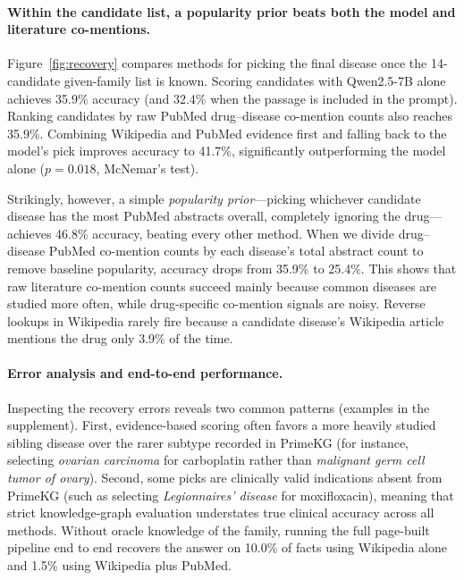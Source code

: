 \paragraph{Within the candidate list, a popularity prior beats both the model and literature co-mentions.}
Figure~\ref{fig:recovery} compares methods for picking the final disease once the 14-candidate given-family list is known. Scoring candidates with Qwen2.5-7B alone achieves 35.9\% accuracy (and 32.4\% when the passage is included in the prompt). Ranking candidates by raw PubMed drug--disease co-mention counts also reaches 35.9\%. Combining Wikipedia and PubMed evidence first and falling back to the model's pick improves accuracy to 41.7\%, significantly outperforming the model alone ($p = 0.018$, McNemar's test).

Strikingly, however, a simple \emph{popularity prior}—picking whichever candidate disease has the most PubMed abstracts overall, completely ignoring the drug—achieves 46.8\% accuracy, beating every other method. When we divide drug--disease PubMed co-mention counts by each disease's total abstract count to remove baseline popularity, accuracy drops from 35.9\% to 25.4\%. This shows that raw literature co-mention counts succeed mainly because common diseases are studied more often, while drug-specific co-mention signals are noisy. Reverse lookups in Wikipedia rarely fire because a candidate disease's Wikipedia article mentions the drug only 3.9\% of the time.

\paragraph{Error analysis and end-to-end performance.}
Inspecting the recovery errors reveals two common patterns (examples in the supplement). First, evidence-based scoring often favors a more heavily studied sibling disease over the rarer subtype recorded in PrimeKG (for instance, selecting \emph{ovarian carcinoma} for carboplatin rather than \emph{malignant germ cell tumor of ovary}). Second, some picks are clinically valid indications absent from PrimeKG (such as selecting \emph{Legionnaires' disease} for moxifloxacin), meaning that strict knowledge-graph evaluation understates true clinical accuracy across all methods. Without oracle knowledge of the family, running the full page-built pipeline end to end recovers the answer on 10.0\% of facts using Wikipedia alone and 1.5\% using Wikipedia plus PubMed.